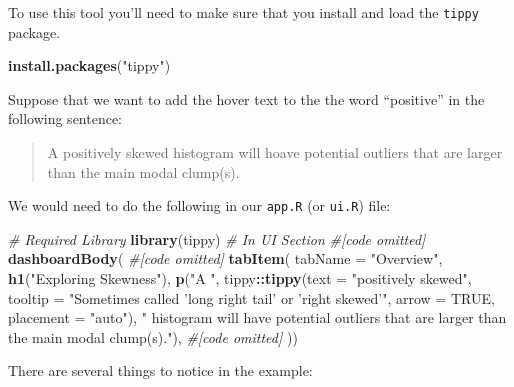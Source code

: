 \documentclass[
]{book}
\newenvironment{Shaded}{\begin{snugshade}}{\end{snugshade}}
\newcommand{\CommentTok}[1]{\textcolor[rgb]{0.56,0.35,0.01}{\textit{#1}}}
\newcommand{\DataTypeTok}[1]{\textcolor[rgb]{0.13,0.29,0.53}{#1}}
\newcommand{\KeywordTok}[1]{\textcolor[rgb]{0.13,0.29,0.53}{\textbf{#1}}}
\newcommand{\NormalTok}[1]{#1}
\newcommand{\OperatorTok}[1]{\textcolor[rgb]{0.81,0.36,0.00}{\textbf{#1}}}
\newcommand{\OtherTok}[1]{\textcolor[rgb]{0.56,0.35,0.01}{#1}}
\newcommand{\StringTok}[1]{\textcolor[rgb]{0.31,0.60,0.02}{#1}}
\begin{document}
To use this tool you'll need to make sure that you install and load the \texttt{tippy} package.

\begin{Shaded}
\begin{Highlighting}[]
\KeywordTok{install.packages}\NormalTok{(}\StringTok{"tippy"}\NormalTok{)}
\end{Highlighting}
\end{Shaded}

Suppose that we want to add the hover text to the the word ``positive'' in the following sentence:

\begin{quote}
A positively skewed histogram will hoave potential outliers that are larger than the main modal clump(s).
\end{quote}

We would need to do the following in our \texttt{app.R} (or \texttt{ui.R}) file:

\begin{Shaded}
\begin{Highlighting}[]
\CommentTok{# Required Library}
\KeywordTok{library}\NormalTok{(tippy)}
\CommentTok{# In UI Section}
\CommentTok{#[code omitted]}
\KeywordTok{dashboardBody}\NormalTok{(}
  \CommentTok{#[code omitted]}
  \KeywordTok{tabItem}\NormalTok{(}
    \DataTypeTok{tabName =} \StringTok{"Overview"}\NormalTok{,}
    \KeywordTok{h1}\NormalTok{(}\StringTok{"Exploring Skewness"}\NormalTok{),}
    \KeywordTok{p}\NormalTok{(}\StringTok{"A "}\NormalTok{,}
\NormalTok{      tippy}\OperatorTok{::}\KeywordTok{tippy}\NormalTok{(}\DataTypeTok{text =} \StringTok{"positively skewed"}\NormalTok{,}
                   \DataTypeTok{tooltip =} \StringTok{"Sometimes called 'long right tail' or 'right skewed'"}\NormalTok{,}
                   \DataTypeTok{arrow =} \OtherTok{TRUE}\NormalTok{, }\DataTypeTok{placement =} \StringTok{"auto"}\NormalTok{),}
      \StringTok{" histogram will have potential outliers that are larger than the main modal clump(s)."}\NormalTok{),}
  \CommentTok{#[code omitted]}
\NormalTok{)) }
\end{Highlighting}
\end{Shaded}

There are several things to notice in the example:
\end{document}
